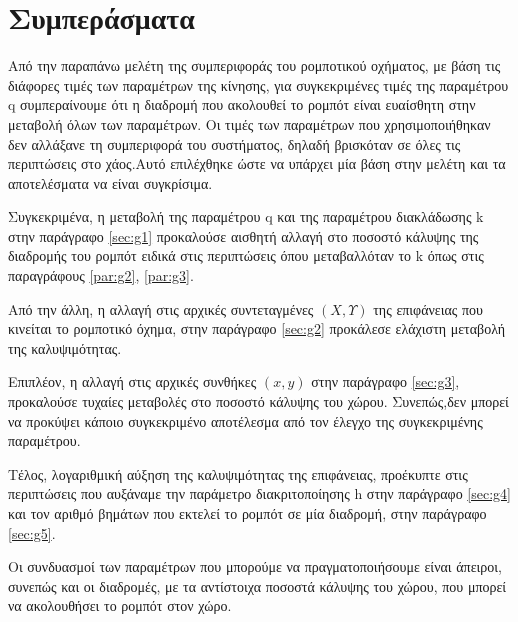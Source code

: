 \section{Συμπεράσματα}

Από την παραπάνω μελέτη της συμπεριφοράς του ρομποτικού οχήματος, με βάση τις διάφορες τιμές των παραμέτρων της κίνησης, για συγκεκριμένες τιμές της παραμέτρου q συμπεραίνουμε ότι η διαδρομή που ακολουθεί το ρομπότ είναι ευαίσθητη στην μεταβολή όλων των παραμέτρων. Οι τιμές των παραμέτρων που χρησιμοποιήθηκαν δεν αλλάξανε τη συμπεριφορά του συστήματος, δηλαδή βρισκόταν σε όλες τις περιπτώσεις στο χάος.Αυτό επιλέχθηκε ώστε να υπάρχει μία βάση στην μελέτη και τα αποτελέσματα να είναι συγκρίσιμα.

Συγκεκριμένα, η μεταβολή της παραμέτρου q και της παραμέτρου διακλάδωσης k στην παράγραφο \ref{sec:g1} προκαλούσε αισθητή αλλαγή στο ποσοστό κάλυψης της διαδρομής του ρομπότ ειδικά στις περιπτώσεις όπου μεταβαλλόταν το k όπως στις παραγράφους \ref{par:g2}, \ref{par:g3}.

Από την άλλη, η αλλαγή στις αρχικές συντεταγμένες $(Χ,Υ)$ της επιφάνειας που κινείται το ρομποτικό όχημα, στην παράγραφο \ref{sec:g2} προκάλεσε ελάχιστη μεταβολή της καλυψιμότητας.

Επιπλέον, η αλλαγή στις αρχικές  συνθήκες $(x,y)$ στην παράγραφο \ref{sec:g3}, προκαλούσε τυχαίες μεταβολές στο ποσοστό κάλυψης του χώρου. Συνεπώς,δεν μπορεί να προκύψει κάποιο συγκεκριμένο αποτέλεσμα από τον έλεγχο της συγκεκριμένης παραμέτρου.

Τέλος, λογαριθμική αύξηση της καλυψιμότητας της επιφάνειας, προέκυπτε στις περιπτώσεις που αυξάναμε την παράμετρο διακριτοποίησης h στην παράγραφο \ref{sec:g4} και τον αριθμό βημάτων που εκτελεί το ρομπότ σε μία διαδρομή, στην παράγραφο \ref{sec:g5}.

Οι συνδυασμοί των παραμέτρων που μπορούμε να πραγματοποιήσουμε είναι άπειροι, συνεπώς και οι διαδρομές, με τα αντίστοιχα ποσοστά κάλυψης του χώρου, που μπορεί να ακολουθήσει το ρομπότ στον χώρο.